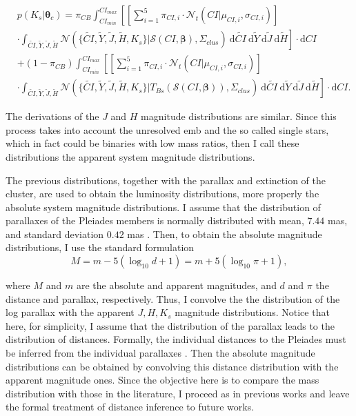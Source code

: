 \begin{align}
&p(K_s | \boldsymbol{\theta}_c)  =   \pi_{CB} \int_{CI_{min}}^{CI_{max}}\left[ \left[\sum_{i=1}^5 \pi_{CI,i} \cdot \mathcal{N}_t(CI| \mu_{CI,i},\sigma_{CI,i})\right]\right. \nonumber \\
&\cdot  \left.\int_{\tilde{CI},\tilde{Y},\tilde{J},\tilde{H}}\mathcal{N}(\{\tilde{CI},\tilde{Y},\tilde{J},\tilde{H},K_s\}|\boldsymbol{\mathcal{S}}(CI, \boldsymbol{\beta}),\Sigma_{clus})~\mathrm{d}\tilde{CI}~\mathrm{d}\tilde{Y}~\mathrm{d}\tilde{J}~\mathrm{d}\tilde{H}\right] \cdot \mathrm{d}CI \nonumber \\
& + (1-\pi_{CB}) \int_{CI_{min}}^{CI_{max}}\left[\left[\sum_{i=1}^5 \pi_{CI,i} \cdot \mathcal{N}_t(CI| \mu_{CI,i},\sigma_{CI,i})\right]\right.\nonumber\\
&\cdot \left. \int_{\tilde{CI},\tilde{Y},\tilde{J},\tilde{H}}\mathcal{N}(\{\tilde{CI},\tilde{Y},\tilde{J},\tilde{H},K_s\}|T_{Bs}(\boldsymbol{\mathcal{S}}(CI, \boldsymbol{\beta})),\Sigma_{clus})~\mathrm{d}\tilde{CI}~\mathrm{d}\tilde{Y}~\mathrm{d}\tilde{J}~\mathrm{d}\tilde{H}\right]\cdot \mathrm{d}CI. \nonumber 
\end{align}

The derivations of the $J$ and $H$ magnitude distributions are similar. Since this process takes into account the unresolved \gls{emb} and the so called single stars, which in fact could be binaries with low mass ratios, then I call these distributions the apparent system magnitude distributions. 

The previous distributions, together with the parallax and extinction of the cluster, are used to obtain the luminosity distributions, more properly the absolute system magnitude distributions. I assume that the distribution of parallaxes of the Pleiades members is normally distributed with mean, $7.44$ mas, and standard deviation $0.42$ mas \citep{Galli2017}. Then, to obtain the absolute magnitude distributions, I use the standard formulation
\begin{equation}
M = m - 5(\log_{10}{d} +1) = m + 5(\log_{10}\pi +1),\nonumber
\end{equation}

where $M$ and $m$ are the absolute and apparent magnitudes, and $d$ and $\pi$ the distance and parallax, respectively. Thus, I convolve the the distribution of the log parallax with the apparent $J,H,K_s$ magnitude distributions. Notice that here, for simplicity, I assume that the distribution of the parallax leads to the distribution of distances. Formally, the individual distances to the Pleiades must be inferred from the individual parallaxes  \cite[see for example][]{2016ApJ...833..119A}. Then the absolute magnitude distributions can be obtained by convolving this distance distribution with the apparent magnitude ones. Since the objective here is to compare the mass distribution with those in the literature, I proceed as in previous works and leave the formal treatment of distance inference to future works.

